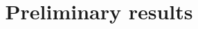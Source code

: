\documentclass[t, usepdftitle=false, red]{beamer}
\institute[17/10/2023]{}
\title[epidemiology \& metagenomics]{Preliminary results}
\date[]{}
\author[Viet-Hun]
\begin{document}
\begin{frame}[plain]
  \titlepage
\end{frame}





% 
% 
% 
% 
% 
% 
% 
%
%
%
% 
\end{document}
